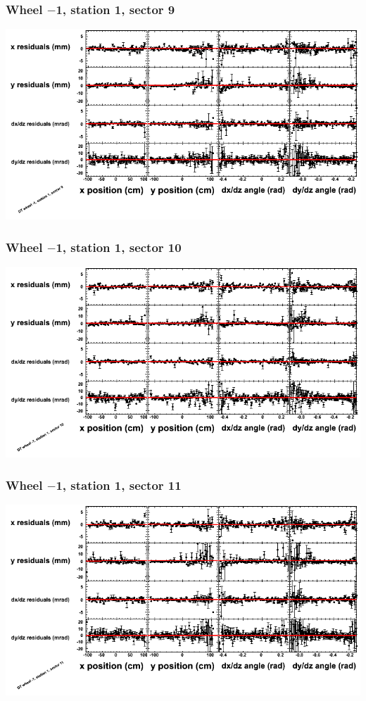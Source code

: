 \documentclass[compress]{beamer}
\begin{document}
\begin{frame}
\frametitle{Wheel $-$1, station 1, sector 9}
\includegraphics[width=\linewidth]{tmppoly_MBwhBst1sec09.png}
\end{frame}

\begin{frame}
\frametitle{Wheel $-$1, station 1, sector 10}
\includegraphics[width=\linewidth]{tmppoly_MBwhBst1sec10.png}
\end{frame}

\begin{frame}
\frametitle{Wheel $-$1, station 1, sector 11}
\includegraphics[width=\linewidth]{tmppoly_MBwhBst1sec11.png}
\end{frame}
\end{document}
